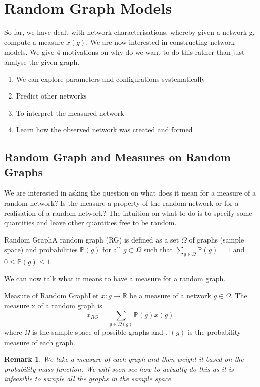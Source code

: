 \documentclass[twoside]{article}
\newcommand{\prob}{\mathbb{P}}
\newtheorem{remark}[theorem]{Remark}
\begin{document}
\section{Random Graph Models}
So far, we have dealt with network characterisations, whereby given a network g, compute a measure $x(g).$ We are now interested in constructing network models. We give 4 motivations on why do we want to do this rather than just analyse the given graph.
\begin{enumerate}
\item We can explore parameters and configurations systematically
\item Predict other networks
\item To interpret the measured network
\item Learn how the observed network was created and formed
\end{enumerate}
\subsection{Random Graph and Measures on Random Graphs}
We are interested in asking the question on what does it mean for a measure of a random network? Is the measure a property of the random network or for a realisation of a random network? The intuition on what to do is to specify some quantities and leave other quantities free to be random.

\begin{definition_exam}{Random Graph}{}A random graph (RG) is defined as a set $\Omega$ of graphs (sample space) and probabilities $\prob(g)$ for all $g \subset \Omega$ such that $\sum_{g \in \Omega}\prob(g) = 1$ and $0 \leq \prob(g) \leq 1.$
\end{definition_exam}

We can now talk what it means to have a measure for a random graph.


\begin{definition_exam}{Measure of Random Graph}{}Let $x:g \rightarrow \mathbb{R}$ be a measure of a network $g \in \Omega$. The measure x of a random graph is 
$$
x_{RG} = \sum_{g \in \Omega(g)}\prob(g)x(g).
$$
where $\Omega$ is the sample space of possible graphs and $\prob(g)$ is the probability measure of each graph.
\end{definition_exam}

\begin{remark}We take a measure of each graph and then weight it based on the probability mass function. We will soon see how to actually do this as it is infeasible to sample all the graphs in the sample space.
\end{remark}
\end{document}
